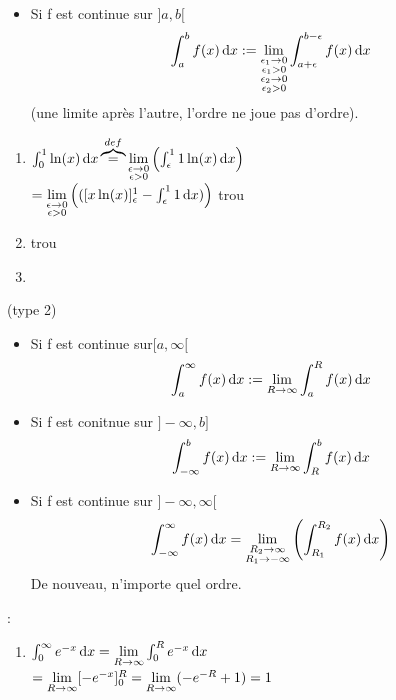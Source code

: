 \documentclass[12pt,a4paper]{article}
\begin{document}
{\begin{boite}
\begin{itemize}
		\item Si f est continue sur $]a,b[$
		\begin{equation}
			\int_{a}^{b} f(x) \, \mathrm d x :=\lim\limits_{\substack{\epsilon_1 \to 0 \\ \epsilon_1 > 0 \\ \epsilon_2 \to 0 \\ \epsilon_2 > 0}}\int_{a+\epsilon}^{b-\epsilon} f(x) \, \mathrm d x
		\end{equation}
		(une limite après l'autre, l'ordre ne joue pas d'ordre).
	\end{itemize}
\end{boite}
\begin{enumerate}
	\item $\int_{0}^{1} \ln(x) \, \mathrm d x \overbrace{=}^{def} \lim\limits_{\substack{\epsilon \to 0 \\ \epsilon > 0}}\left(\int_{\epsilon}^{1} 1\ln(x) \, \mathrm d x\right)$\\
	$= \lim\limits_{\substack{\epsilon \to 0 \\ \epsilon > 0}}\left(([x\ln(x)]_\epsilon^1 - \int_{\epsilon}^{1} 1 \, \mathrm d x)\right)$ {trou}
	\item {trou}
	\item 
\end{enumerate}
\begin{boite}
	\Definition (type 2)\\
	\begin{itemize}
		\item Si f est continue sur$[a,\infty[$
		\begin{equation}
			\int_{a}^{\infty} f(x) \, \mathrm d x := \lim\limits_{R \to \infty}\int_{a}^{R} f(x) \, \mathrm d x
		\end{equation}
		\item Si f est conitnue sur $]-\infty,b]$
		\begin{equation}
			\int_{-\infty}^{b} f(x) \, \mathrm d x := \lim\limits_{R \to \infty}\int_{R}^{b} f(x) \, \mathrm d x
		\end{equation}
		\item Si f est continue sur $]-\infty,\infty[$
		\begin{equation}
			\int_{-\infty}^{\infty} f(x) \, \mathrm d x = \lim\limits_{\substack{R_2 \to \infty \\ R_1 \to -\infty}}\left(\int_{R_1}^{R_2} f(x) \, \mathrm d x\right)
		\end{equation}
		De nouveau, n'importe quel ordre.
	\end{itemize}
\end{boite}
:
\begin{enumerate}
	\item $\int_{0}^{\infty} e^{-x} \, \mathrm d x = \lim\limits_{R \to \infty}\int_{0}^{R} e^{-x} \, \mathrm d x$\\
	$= \lim\limits_{R\to \infty}[-e^{-x}]_0^R = \lim\limits_{R\to \infty}(-e^{-R} + 1) = 1$

\end{enumerate}}
\end{document}
